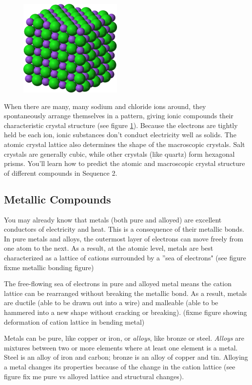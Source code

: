 \begin{figure}
\noindent\includegraphics[width=2in]{NaCl_lattice.png}
\caption{}
\label{fig:NaCl_lattice}
\end{figure}

When there are many, many sodium and chloride ions around, they spontaneously 
arrange themselves in a pattern, giving ionic compounds their characteristic 
crystal structure (see figure \ref{fig:NaCl_lattice}). Because the electrons are 
tightly held be each ion, ionic substances don't conduct electricity well as 
solids. The atomic crystal lattice also determines the shape of the macroscopic 
crystals. Salt crystals are generally cubic, while other crystals (like quartz) 
form hexagonal prisms. You'll learn how to predict the atomic and macroscopic 
crystal structure of different compounds in Sequence 2. 

\subsection{Metallic Compounds}
You may already know that metals (both pure and alloyed) are excellent conductors 
of electricity and heat. This is a consequence of their metallic bonds. In pure 
metals and alloys, the outermost layer of electrons can move freely from one atom 
to the next. As a result, at the atomic level, metals are best characterized as a 
lattice of cations surrounded by a ''sea of electrons" (see figure	fixme metallic bonding figure)

The free-flowing sea of electrons in pure and alloyed metal means the cation 
lattice can be rearranged without breaking the metallic bond. As a result, metals 
are ductile (able to be drawn out into a wire) and malleable (able to be hammered 
into a new shape without cracking or breaking). (fixme figure showing deformation of cation lattice in bending metal)

Metals can be pure, like copper or iron, or \textit{alloys}, like bronze or steel. 
\textit{Alloys} are mixtures between two or more elements where at least one 
element is a metal. Steel is an alloy of iron and carbon; bronze is 
an alloy of copper and tin. Alloying a metal changes its properties because of 
the change in the cation lattice (see figure fix me pure vs alloyed lattice and 
structural changes). 

